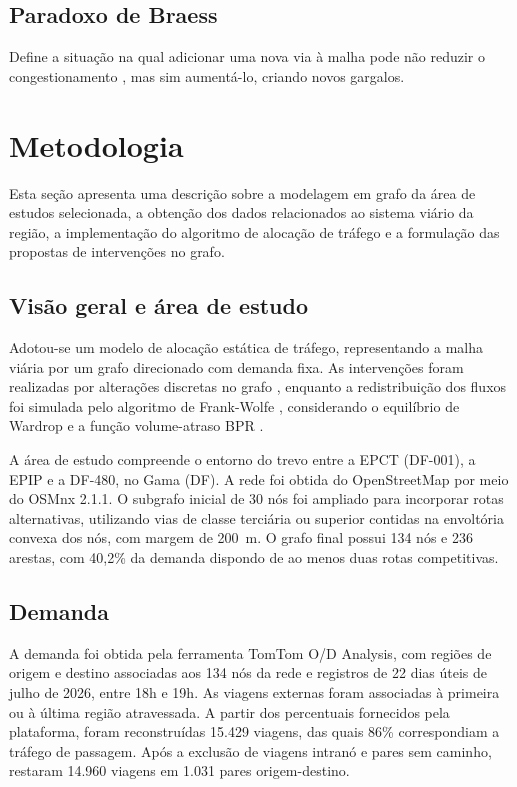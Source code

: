 \documentclass[portuguese]{sbc2025}%
\begin{document}
\subsection{Paradoxo de Braess}
Define a situação na qual adicionar uma nova via à malha pode não reduzir o congestionamento \cite{braess2005}, mas sim aumentá-lo, criando novos gargalos.

\section{Metodologia}
\label{sec:metodologia}

Esta seção apresenta uma descrição sobre a modelagem em grafo da área de estudos selecionada, a obtenção dos dados relacionados ao sistema viário da região, a implementação do algoritmo de alocação de tráfego e a formulação das propostas de intervenções no grafo.

\subsection{Visão geral e área de estudo}

Adotou-se um modelo de alocação estática de tráfego, representando a malha viária por um grafo direcionado com demanda fixa. As intervenções foram realizadas por alterações discretas no grafo \cite{leblanc1975dndp}, enquanto a redistribuição dos fluxos foi simulada pelo algoritmo de Frank-Wolfe \cite{leblanc1975fw}, considerando o equilíbrio de Wardrop \cite{wardrop1952} e a função volume-atraso BPR \cite{bpr1964}.

A área de estudo compreende o entorno do trevo entre a EPCT (DF-001), a EPIP e a DF-480, no Gama (DF). A rede foi obtida do OpenStreetMap por meio do OSMnx 2.1.1. O subgrafo inicial de 30 nós foi ampliado para incorporar rotas alternativas, utilizando vias de classe terciária ou superior contidas na envoltória convexa dos nós, com margem de 200~m. O grafo final possui 134 nós e 236 arestas, com 40,2\% da demanda dispondo de ao menos duas rotas competitivas.

\subsection{Demanda}

A demanda foi obtida pela ferramenta TomTom O/D Analysis, com regiões de origem e destino associadas aos 134 nós da rede e registros de 22 dias úteis de julho de 2026, entre 18h e 19h. As viagens externas foram associadas à primeira ou à última região atravessada. A partir dos percentuais fornecidos pela plataforma, foram reconstruídas 15.429 viagens, das quais 86\% correspondiam a tráfego de passagem. Após a exclusão de viagens intranó e pares sem caminho, restaram 14.960 viagens em 1.031 pares origem-destino.
\end{document}
